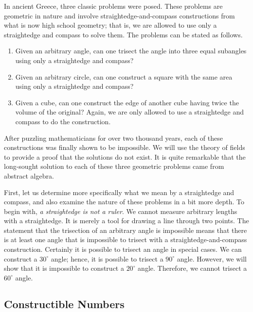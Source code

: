 In ancient Greece, three classic problems were posed. These problems
are geometric in nature and involve straightedge-and-compass
constructions from what is now high school geometry; that is, we are
allowed to use only a straightedge and compass to solve them. The
problems can be stated as follows.    
\begin{enumerate}

\item
Given an arbitrary angle, can one trisect the angle into three equal
subangles using only a straightedge and compass?

\item
Given an arbitrary circle, can one construct a square with the same
area using only a straightedge and compass?

\item
Given a cube, can one construct the edge of another cube having twice
the volume of the original? Again, we are only allowed to use a
straightedge and compass to do the construction.

\end{enumerate}
After puzzling mathematicians for over two thousand years, each of
these constructions was finally shown to be impossible.  We will use
the theory of fields to provide a proof that the solutions do not
exist.  It is quite remarkable that the long-sought solution to each
of these three geometric problems came from abstract algebra.  


First, let us determine more specifically what we mean by a
straightedge and compass, and also examine the nature of these
problems in a bit more depth.  To begin with, {\em a straightedge is
not a ruler}. We cannot measure arbitrary lengths with a straightedge.
It is merely a tool for drawing a line through two points. The
statement that the trisection of an arbitrary angle is impossible
means that there is at least one angle that is impossible to trisect
with a straightedge-and-compass construction. Certainly it is
possible to trisect an angle in special cases.  We can construct a
$30^\circ$ angle; hence, it is possible to trisect a $90^\circ$
angle.  However, we will show that it is impossible to construct a 
$20^\circ$ angle.  Therefore, we cannot trisect a $60^\circ$ angle. 

 

\subsection*{Constructible Numbers}
 

